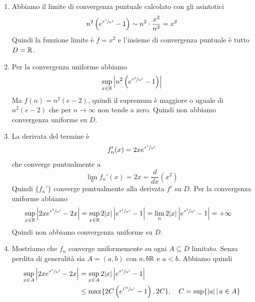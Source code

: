\documentclass[a4paper]{article}
\begin{document}
\begin{snippetsolution}{}
    \begin{enumerate}
        \item Abbiamo il limite di convergenza puntuale calcolato con gli asintotici
            \[
                n^2 \left(
                    e^{\sfrac{x^2}{n^2}}-1
                \right) \sim n^2 \cdot \frac{x^2}{n^2} = x^2
            \]
            Quindi la funzione limite è \(f = x^2\) e l'insieme di convergenza puntuale
            è tutto \(D = \mathbb{R}\).
        \item Per la convergenza uniforme abbiamo
            \begin{align*}
                \sup_{x\in \mathbb{R}} \left|
                n^2 \left(
                    e^{\sfrac{x^2}{n^2}}-1
                \right)
                \right|
            \end{align*}
            Ma \(f(n) = n^2(e-2)\), quindi il supremum è maggiore o uguale di \(n^2(e-2)\)
            che per \(n \to \infty\) non tende a zero. Quindi non abbiamo convergenza uniforme su \(D\).
        \item La derivata del termine è
            \[
                f_n'(x) = 2x e^{\sfrac{x^2}{n^2}}
            \]
            che converge puntualmente a
            \[
                \lim_n f_n'(x) = 2x = \frac{d}{dx}(x^2)
            \]
            Quindi \(\{f_n'\}\) converge puntualmente alla derivata \(f'\)
            su \(D\). Per la convergenza uniforme abbiamo
            \begin{align*}
                \sup_{x\in\mathbb{R}} \left|2x e^{\sfrac{x^2}{n^2}} - 2x\right|
                &= \sup_{x\in\mathbb{R}} 2|x| \left|
                e^{\sfrac{x^2}{n^2}} - 1
                \right| = \lim_n 2|x| \left|
                e^{\sfrac{x^2}{n^2}} - 1
                \right| = +\infty
            \end{align*}
            Quindi non abbiamo convergenza uniforme su \(D\).
        \item Mostriamo che \(f_n\) converge uniformemente su ogni \(A \subseteq D\) limitato.
            Senza perdita di generalità sia \(A = (a,b)\) con \(a,b \mathbb{R}\) e \(a<b\).
            Abbiamo quindi
            \begin{align*}
                \sup_{x\in A} \left|
                2xe^{\sfrac{x^2}{n^2}} - 2x
                \right|
                &= \sup_{x\in A} 2|x| \left|e^{\sfrac{x^2}{n^2}} - 1\right| \\
                &\leq \max\{
                    2C\left(
                        e^{\sfrac{C^2}{n^2}} - 1
                    \right), 2C
                \}, \quad C = \sup\{|a| \,|\, a \in A\}
            \end{align*}
    \end{enumerate}
\end{snippetsolution}
\end{document}
